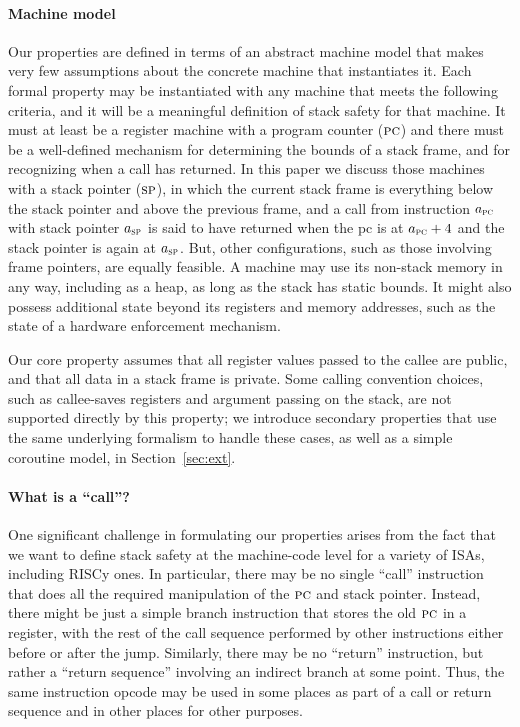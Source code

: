 \documentclass[10pt,conference]{ieeetran}%
\theoremstyle{definition}
\begin{document}
\paragraph*{Machine model}
Our properties are defined in terms of an abstract machine model that makes very few
assumptions about the concrete machine that instantiates it. Each formal property
may be instantiated with any machine that meets the following criteria, and it
will be a meaningful definition of stack safety for that machine. It must at least be a
register machine with a program counter (\(\textsc{pc}\)) and there must be a well-defined
mechanism for determining the bounds of a stack frame, and for recognizing when a call
has returned. In this paper we discuss those machines with a stack pointer (\(\textsc{sp}\)),
in which the current stack frame is everything below the stack pointer and above the
previous frame, and a call from instruction \(a_{\textsc{pc}}\) with stack pointer \(a_{\textsc{sp}}\)
is said to have returned when the pc is at \(a_{\textsc{pc}} + 4\) and the stack pointer
is again at \(a_{\textsc{sp}}\). But, other configurations, such as those involving frame pointers,
are equally feasible. A machine may use its non-stack memory in any way, including
as a heap, as long as the stack has static bounds. It might also possess additional
state beyond its registers and memory addresses, such as the state of a hardware
enforcement mechanism.

Our core property assumes that all register values passed to the callee are public,
and that all data in a stack frame is private.
Some calling convention choices, such as callee-saves registers and argument
passing on the stack, are not supported directly by this property; we introduce
secondary properties that use the same underlying formalism to handle these cases,
as well as a simple coroutine model, in Section~\ref{sec:ext}.

\paragraph*{What is a ``call''?}  One significant challenge in formulating our
properties arises from the fact that we want to define stack safety at the
machine-code level for a variety of ISAs, including RISCy
\ifaftersubmission{}\fi ones.  In
particular, there may be no single ``call'' instruction that does all the
required manipulation of the \(\textsc{pc}\) and stack pointer. Instead, there
might be just a simple branch instruction that stores the old \(\textsc{pc}\) in
a register, with the rest of the call sequence performed by other
instructions either before or after the jump.  Similarly, there may be no
``return'' instruction, but rather a ``return sequence'' involving an
indirect branch at some point.  Thus, the same instruction opcode may be
used in some places as part of a call or return sequence and in other places
for other purposes.
\end{document}
